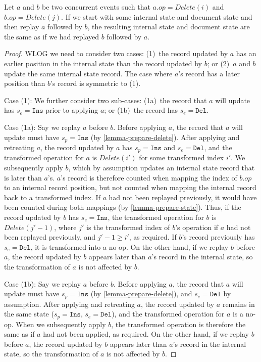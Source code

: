\documentclass[sigplan,10pt]{acmart}
\begin{document}
\begin{lemma}\label{lemma-del-del}
  Let $a$ and $b$ be two concurrent events such that $a.\mathit{op} = \mathit{Delete}(i)$ and $b.\mathit{op} = \mathit{Delete}(j)$.
  If we start with some internal state and document state and then replay $a$ followed by $b$, the resulting internal state and document state are the same as if we had replayed $b$ followed by $a$.
\end{lemma}
\begin{proof}
  WLOG we need to consider two cases: (1)~the record updated by $a$ has an earlier position in the internal state than the record updated by $b$; or (2)~$a$ and $b$ update the same internal state record. The case where $a$'s record has a later position than $b$'s record is symmetric to (1).

  Case (1): We further consider two sub-cases: (1a)~the record that $a$ will update has $s_e = \texttt{Ins}$ prior to applying $a$; or (1b)~the record has $s_e = \texttt{Del}$.

  Case (1a): Say we replay $a$ before $b$.
  Before applying $a$, the record that $a$ will update must have $s_p = \texttt{Ins}$ (by \autoref{lemma-prepare-delete}).
  After applying and retreating $a$, the record updated by $a$ has $s_p = \texttt{Ins}$ and $s_e = \texttt{Del}$, and the transformed operation for $a$ is $\mathit{Delete}(i')$ for some transformed index $i'$.
  We subsequently apply $b$, which by assumption updates an internal state record that is later than $a$'s.
  $a$'s record is therefore counted when mapping the index of $b.\mathit{op}$ to an internal record position, but not counted when mapping the internal record back to a transformed index.
  If $a$ had not been replayed previously, it would have been counted during both mappings (by \autoref{lemma-prepare-state}).
  Thus, if the record updated by $b$ has $s_e = \texttt{Ins}$, the transformed operation for $b$ is $\mathit{Delete}(j'-1)$, where $j'$ is the transformed index of $b$'s operation if $a$ had not been replayed previously, and $j'-1 \geq i'$, as required.
  If $b$'s record previously has $s_e = \texttt{Del}$, it is transformed into a no-op.
  On the other hand, if we replay $b$ before $a$, the record updated by $b$ appears later than $a$'s record in the internal state, so the transformation of $a$ is not affected by $b$.

  Case (1b): Say we replay $a$ before $b$.
  Before applying $a$, the record that $a$ will update must have $s_p = \texttt{Ins}$ (by \autoref{lemma-prepare-delete}), and $s_e = \texttt{Del}$ by assumption.
  After applying and retreating $a$, the record updated by $a$ remains in the same state ($s_p = \texttt{Ins}$, $s_e = \texttt{Del}$), and the transformed operation for $a$ is a no-op.
  When we subsequently apply $b$, the transformed operation is therefore the same as if $a$ had not been applied, as required.
  On the other hand, if we replay $b$ before $a$, the record updated by $b$ appears later than $a$'s record in the internal state, so the transformation of $a$ is not affected by $b$.


\end{proof}
\end{document}
